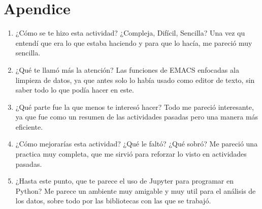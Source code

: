 \documentclass{article}
\begin{document}
\section{Apendice}
\begin{enumerate}
\item¿Cómo se te hizo esta actividad? ¿Compleja, Difícil, Sencilla?
Una vez qu entendí que era lo que estaba haciendo y para que lo hacía, me pareció muy sencilla.

\item¿Qué te llamó más la atención?
Las funciones de EMACS enfocadas ala limpieza de datos, ya que antes solo lo había usado como editor de texto, sin saber todo lo que podía hacer en este.

\item¿Qué parte fue la que menos te interesó hacer?
Todo me pareció interesante, ya que fue como un resumen de las actividades pasadas pero una manera más eficiente.

\item¿Cómo mejorarías esta actividad? ¿Qué le faltó? ¿Qué sobró?
Me pareció una practica muy completa, que me sirvió para reforzar lo visto en actividades pasadas.

\item¿Hasta este punto, que te parece el uso de Jupyter para programar en Python?
Me parece un ambiente muy amigable y muy util para el análisis de los datos, sobre todo por las bibliotecas con las que se trabajó.

\end{enumerate}
\end{document}
